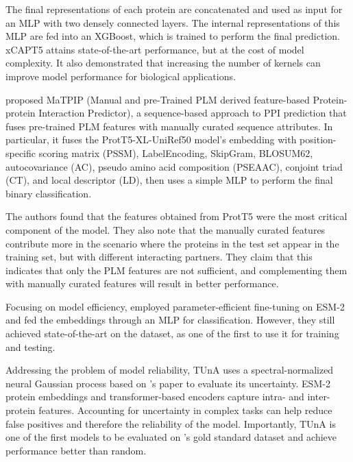 \documentclass{article}
\begin{document}
The final representations of each protein are concatenated and used as input for an MLP with two densely connected layers. The internal representations of this MLP are fed into an XGBoost, which is trained to perform the final prediction. xCAPT5 attains state-of-the-art performance, but at the cost of model complexity. It also demonstrated that increasing the number of kernels can improve model performance for biological applications. 

\citet{ghosh_matpip_2024} proposed MaTPIP (Manual and pre-Trained PLM derived feature-based Protein-protein Interaction Predictor), a sequence-based approach to PPI prediction that fuses pre-trained PLM features with manually curated sequence attributes. In particular, it fuses the ProtT5-XL-UniRef50 model's embedding with position-specific scoring matrix (PSSM), LabelEncoding, SkipGram, BLOSUM62, autocovariance (AC), pseudo amino acid composition (PSEAAC), conjoint triad (CT), and local descriptor (LD), then uses a simple MLP to perform the final binary classification.

The authors found that the features obtained from ProtT5 were the most critical component of the model. They also note that the manually curated features contribute more in the scenario where the proteins in the test set appear in the training set, but with different interacting partners. They claim that this indicates that only the PLM features are not sufficient, and complementing them with manually curated features will result in better performance. 

Focusing on model efficiency, \citet{sledzieski_democratizing_2024} employed parameter-efficient fine-tuning on ESM-2 and fed the embeddings through an MLP for classification. However, they still achieved state-of-the-art on the \citep{bernett_cracking_2024} dataset, as one of the first to use it for training and testing. 

Addressing the problem of model reliability, TUnA \citep{ko_tuna_2024} uses a spectral-normalized neural Gaussian process based on \citet{liu_simple_2020}'s paper to evaluate its uncertainty. ESM-2 protein embeddings and transformer-based encoders capture intra- and inter-protein features. Accounting for uncertainty in complex tasks can help reduce false positives and therefore the reliability of the model. Importantly, TUnA is one of the first models to be evaluated on \citet{bernett_cracking_2024}'s gold standard dataset and achieve performance better than random. 
\end{document}
